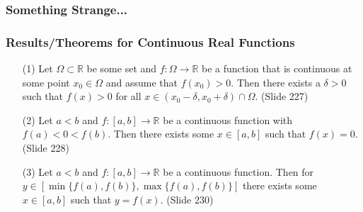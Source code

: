 \documentclass{beamer}
\begin{document}
\begin{frame}
    \frametitle{Something Strange...}
    \begin{figure}
    \end{figure}
    

\end{frame}
\begin{frame}
    \frametitle{Results/Theorems for Continuous Real Functions}
    \begin{itemize}
        \item[(1)] Let $\Omega\subset\mathbb{R}$ be some set and $f:\Omega\to \mathbb{R}$ be a function
         that is continuous at some point $x_0 \in \Omega$  and assume that $f(x_0)>0$. 
         Then there exists a $\delta>0$ such that $f(x)>0$ for all $x \in (x_0-\delta,x_0+\delta)\cap \Omega$. (Slide 227)
        \item[(2)] Let $a<b$ and $f:[a,b]→\mathbb{R}$ be a continuous function with $f(a)<0<f(b)$. 
        Then there exists some $x \in [a,b]$ such that $f(x)=0$. (Slide 228)
        \item[(3)] Let $a<b$ and $f:[a,b]→\mathbb{R}$ be a continuous function. 
        Then for $y \in [\min\{f(a),f(b)\},\max \{f(a),f(b)\}]$ there exists some $x \in [a,b]$ such that $y=f(x)$. (Slide 230)
    \end{itemize}
\end{frame}
\end{document}
